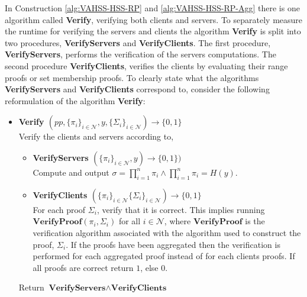 In Construction \ref{alg:VAHSS-HSS-RP} and \ref{alg:VAHSS-HSS-RP-Agg} there is one algorithm called \textbf{Verify}, verifying both clients and servers.
To separately measure the runtime for verifying the servers and clients the  algorithm \textbf{Verify} is split into two procedures, \textbf{VerifyServers} and \textbf{VerifyClients}. The first procedure, \textbf{VerifyServers}, performs the verification of the servers computations. The second procedure  \textbf{VerifyClients}, verifies the clients by evaluating their range proofs or set membership proofs. To clearly state what the algorithms \textbf{VerifyServers} and \textbf{VerifyClients} correspond to, consider the following reformulation of the algorithm \textbf{Verify}: 
\begin{itemize}
 \item\textbf{Verify $(pp, \{\pi_i\}_{i\in\mathcal{N}},y,\{\Sigma_i\}_{i\in\mathcal{N}})\xrightarrow[]{}\{0,1\}$}\\
 Verify the clients and servers according to, 
 	\begin{itemize}
 	\item \textbf{VerifyServers $(\{\pi_i\}_{i\in\mathcal{N}},y)\xrightarrow[]{}\{0,1\})$}\\
 Compute and output $\sigma= \prod_{i=1}^n \pi_i \wedge \prod_{i=1}^n \pi_i = H(y)$.
 \item \textbf{VerifyClients $(\{\pi_i\}_{i\in\mathcal{N}}\{\Sigma_i\}_{i\in\mathcal{N}})\xrightarrow[]{}\{0,1\}$ }\\
 For each proof $\Sigma_i$, verify that it is correct. This implies running  $\textbf{VerifyProof}(\pi_i, \Sigma_i)$ for all $i\in\mathcal{N}$, where $\textbf{VerifyProof}$ is the verification algorithm associated with the algorithm used to construct the proof, $\Sigma_i$. If the proofs have been aggregated then the verification is performed for each aggregated proof instead of for each clients proofs. If all proofs are correct return $1$, else $0$.  
 \end{itemize}
Return  $\textbf{VerifyServers}\wedge \textbf{VerifyClients}$
\end{itemize}

